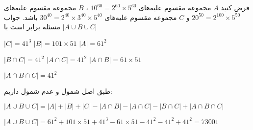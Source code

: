  فرض کنید $A$ مجموعه مقسوم علیه‌های
        $10 ^ {60} = 2^{60}\times5^{60}$
        ، $B$ مجموعه مقسوم علیه‌های 
        $20^{50} = 2^{100}\times5^{50}$
        و $C$ مجموعه مقسوم علیه‌های
        $30^{40} = 2^{40}\times3^{40}\times5^{40}$
        باشد. جواب مسئله برابر است با
        $|A \cup B \cup C|$ \\
        
        \begin{center}
            $|C| = 41^3$  $|B| = 101\times51$  $|A| = 61^2$  \medbreak
        
             $|B \cap C| = 41^2$    $|A \cap C| = 41^2$   $|A \cap B| = 61\times51$ \medbreak
             
             $|A \cap B \cap C| = 41^2$ \\
        \end{center}
        طبق اصل شمول و عدم شمول داریم:\\
        \begin{center}
            $|A \cup B \cup C| = |A| + |B| + |C| - |A \cap B| - |A \cap C| - |B \cap C| + |A \cap B \cap C|$
            \medbreak
            
            $|A \cup B \cup C| = 61^2 + 101\times51 + 41^3 - 61\times51 - 41^2 - 41^2 + 41^2 = 73001$
        \end{center}